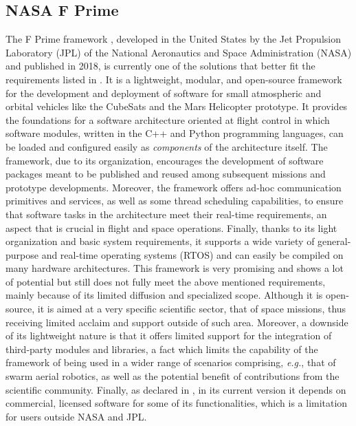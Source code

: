 \subsection{NASA F Prime}
\label{sec:related_work_fprime}
The F Prime framework \cite{bocchino_f_2018}, developed in the United States by the Jet Propulsion Laboratory (JPL) of the National Aeronautics and Space Administration (NASA) and published in 2018, is currently one of the solutions that better fit the requirements listed in . It is a lightweight, modular, and open-source framework for the development and deployment of software for small atmospheric and orbital vehicles like the CubeSats and the Mars Helicopter prototype. It provides the foundations for a software architecture oriented at flight control in which software modules, written in the C++ and Python programming languages, can be loaded and configured easily as \emph{components} of the architecture itself. The framework, due to its organization, encourages the development of software packages meant to be published and reused among subsequent missions and prototype developments. Moreover, the framework offers ad-hoc communication primitives and services, as well as some thread scheduling capabilities, to ensure that software tasks in the architecture meet their real-time requirements, an aspect that is crucial in flight and space operations. Finally, thanks to its light organization and basic system requirements, it supports a wide variety of general-purpose and real-time operating systems (RTOS) and can easily be compiled on many hardware architectures. This framework is very promising and shows a lot of potential but still does not fully meet the above mentioned requirements, mainly because of its limited diffusion and specialized scope. Although it is open-source, it is aimed at a very specific scientific sector, that of space missions, thus receiving limited acclaim and support outside of such area. Moreover, a downside of its lightweight nature is that it offers limited support for the integration of third-party modules and libraries, a fact which limits the capability of the framework of being used in a wider range of scenarios comprising, \emph{e.g.}, that of swarm aerial robotics, as well as the potential benefit of contributions from the scientific community. Finally, as declared in \cite{bocchino_f_2018}, in its current version it depends on commercial, licensed software for some of its functionalities, which is a limitation for users outside NASA and JPL.

